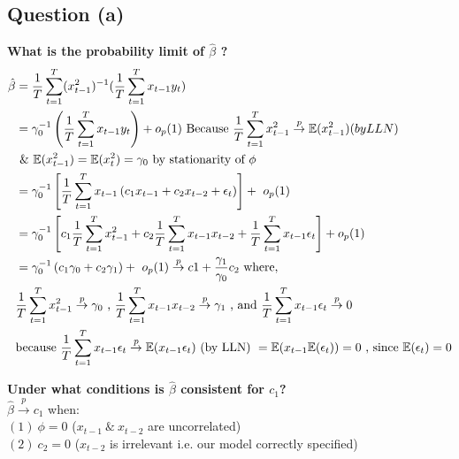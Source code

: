 \documentclass[11pt]{article}
\theoremstyle{definition}
\def\inprob{\stackrel{p}{\rightarrow}}
\begin{document}
\subsection{Question (a)}
\textbf{What is the probability limit of $\hat{\beta}$ ?}
\begin{equation*}
\begin{split}
\hat{\beta} & = \frac{1}{T}\sum_{t=1}^{T}(x_{t-1}^{2})^{-1}(\frac{1}{T}\sum_{t=1}^{T}x_{t-1}y_{t}) \\
 & = \gamma_{0}^{-1}\left(\frac{1}{T}\sum_{t=1}^{T}x_{t-1}y_{t}\right) + o_{p}(1) \
 \text{Because} \ \frac{1}{T}\sum_{t=1}^{T}x_{t-1}^{2} \inprob \mathbb{E}(x_{t-1}^{2}) \text(by LLN) \\
 & \ \& \ \mathbb{E}(x_{t-1}^{2})=\mathbb{E}(x_{t}^{2})=\gamma_{0} \ \text{by stationarity of} \ \phi \\
 & = \gamma_{0}^{-1} \left[\frac{1}{T}\sum_{t=1}^{T}x_{t-1}\left(c_{1}x_{t-1}+c_{2}x_{t-2}+\epsilon_{t}\right) \right] + \ o_{p}(1) \\
 & = \gamma_{0}^{-1}\left[c_{1}\frac{1}{T}\sum_{t=1}^{T}x_{t-1}^{2} + c_{2}\frac{1}{T}\sum_{t=1}^{T}x_{t-1}x_{t-2} + \frac{1}{T}\sum_{t=1}^{T}x_{t-1}\epsilon_{t}\right] + o_{p}(1) \\
 & = \gamma_{0}^{-1}\left(c_{1}\gamma_{0}+c_{2}\gamma_{1}\right) + \ o_{p}(1) \inprob c1+\frac{\gamma_{1}}{\gamma_{0}}c_{2} \ \text{where}, \\
 & \frac{1}{T}\sum_{t=1}^{T}x_{t-1}^{2} \inprob \gamma_{0} \ \text{,} \  \frac{1}{T}\sum_{t=1}^{T}x_{t-1}x_{t-2} \inprob \gamma_{1} \ \text{, and} \ \frac{1}{T}\sum_{t=1}^{T}x_{t-1}\epsilon_{t}\inprob 0 \\
 & \text{because} \  \frac{1}{T}\sum_{t=1}^{T}x_{t-1}\epsilon_{t} \inprob \mathbb{E}(x_{t-1}\epsilon_{t}) \ \text{(by LLN)} \ = \mathbb{E}(x_{t-1}\mathbb{E}(\epsilon_{t}))=0 \ \text{, since} \ \mathbb{E}(\epsilon_{t})=0
\end{split}
\end{equation*} 

\noindent
\textbf{Under what conditions is $\hat{\beta}$  consistent for $c_{1}$?} \\

$\hat{\beta} \inprob c_{1}$ when: \\

$(1) \ \phi=0$ ($x_{t-1} \ \& \ x_{t-2}$ are uncorrelated) \\

$(2) \ c_{2}=0$ ($x_{t-2}$ is irrelevant i.e. our model correctly specified)
\end{document}
